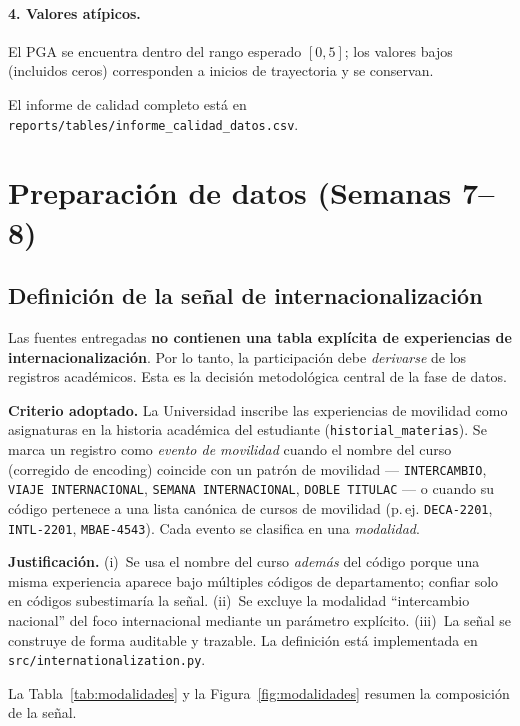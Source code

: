 \documentclass[12pt,a4paper]{article}
\begin{document}
\paragraph{4. Valores atípicos.} El PGA se encuentra dentro del rango esperado
$[0,5]$; los valores bajos (incluidos ceros) corresponden a inicios de
trayectoria y se conservan.

El informe de calidad completo está en
\texttt{reports/tables/informe\_calidad\_datos.csv}.

\section{Preparación de datos (Semanas 7--8)}
\subsection{Definición de la señal de internacionalización}
\label{sec:senal}
Las fuentes entregadas \textbf{no contienen una tabla explícita de experiencias
de internacionalización}. Por lo tanto, la participación debe \emph{derivarse} de
los registros académicos. Esta es la decisión metodológica central de la fase de
datos.

\textbf{Criterio adoptado.} La Universidad inscribe las experiencias de movilidad
como asignaturas en la historia académica del estudiante
(\texttt{historial\_materias}). Se marca un registro como \emph{evento de
movilidad} cuando el nombre del curso (corregido de encoding) coincide con un
patrón de movilidad --- \texttt{INTERCAMBIO}, \texttt{VIAJE INTERNACIONAL},
\texttt{SEMANA INTERNACIONAL}, \texttt{DOBLE TITULAC} --- o cuando su código
pertenece a una lista canónica de cursos de movilidad (p.\,ej. \texttt{DECA-2201},
\texttt{INTL-2201}, \texttt{MBAE-4543}). Cada evento se clasifica en una
\emph{modalidad}.

\textbf{Justificación.} (i)~Se usa el nombre del curso \emph{además} del código
porque una misma experiencia aparece bajo múltiples códigos de departamento;
confiar solo en códigos subestimaría la señal. (ii)~Se excluye la modalidad
``intercambio nacional'' del foco internacional mediante un parámetro explícito.
(iii)~La señal se construye de forma auditable y trazable. La definición está
implementada en \texttt{src/internationalization.py}.

La Tabla~\ref{tab:modalidades} y la Figura~\ref{fig:modalidades} resumen la
composición de la señal.
\end{document}
